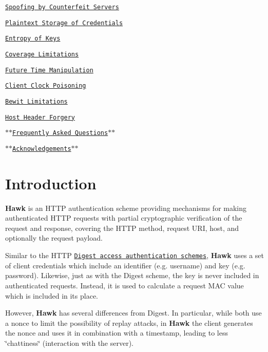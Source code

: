 \begin{DoxyItemize}
\begin{DoxyItemize}
\item \href{#spoofing-by-counterfeit-servers}{\tt Spoofing by Counterfeit Servers}
\item \href{#plaintext-storage-of-credentials}{\tt Plaintext Storage of Credentials}
\item \href{#entropy-of-keys}{\tt Entropy of Keys}
\item \href{#coverage-limitations}{\tt Coverage Limitations}
\item \href{#future-time-manipulation}{\tt Future Time Manipulation}
\item \href{#client-clock-poisoning}{\tt Client Clock Poisoning}
\item \href{#bewit-limitations}{\tt Bewit Limitations}
\item \href{#host-header-forgery}{\tt Host Header Forgery} 
\end{DoxyItemize}
\item \href{#frequently-asked-questions}{\tt $\ast$$\ast$\+Frequently Asked Questions$\ast$$\ast$} 
\end{DoxyItemize}


\begin{DoxyItemize}
\item \href{#acknowledgements}{\tt $\ast$$\ast$\+Acknowledgements$\ast$$\ast$}
\end{DoxyItemize}

\section*{Introduction}

{\bfseries Hawk} is an H\+T\+T\+P authentication scheme providing mechanisms for making authenticated H\+T\+T\+P requests with partial cryptographic verification of the request and response, covering the H\+T\+T\+P method, request U\+R\+I, host, and optionally the request payload.

Similar to the H\+T\+T\+P \href{http://www.ietf.org/rfc/rfc2617.txt}{\tt Digest access authentication schemes}, {\bfseries Hawk} uses a set of client credentials which include an identifier (e.\+g. username) and key (e.\+g. password). Likewise, just as with the Digest scheme, the key is never included in authenticated requests. Instead, it is used to calculate a request M\+A\+C value which is included in its place.

However, {\bfseries Hawk} has several differences from Digest. In particular, while both use a nonce to limit the possibility of replay attacks, in {\bfseries Hawk} the client generates the nonce and uses it in combination with a timestamp, leading to less \char`\"{}chattiness\char`\"{} (interaction with the server).

